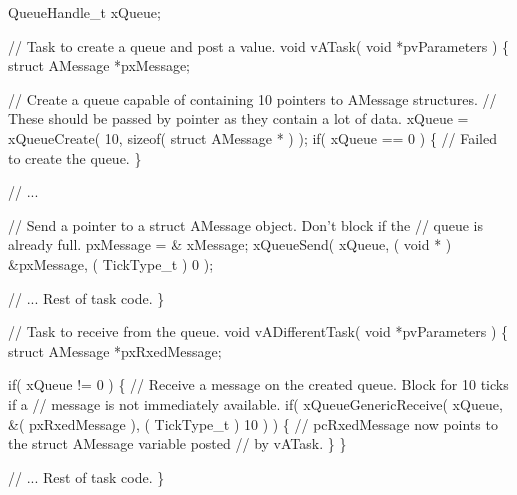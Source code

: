 \begin{DoxyPre}QueueHandle\_t xQueue;\end{DoxyPre}



\begin{DoxyPre}// Task to create a queue and post a value.
void vATask( void *pvParameters )
\{
struct AMessage *pxMessage;\end{DoxyPre}



\begin{DoxyPre}   // Create a queue capable of containing 10 pointers to AMessage structures.
   // These should be passed by pointer as they contain a lot of data.
   xQueue = xQueueCreate( 10, sizeof( struct AMessage * ) );
   if( xQueue == 0 )
   \{
    // Failed to create the queue.
   \}\end{DoxyPre}



\begin{DoxyPre}   // ...\end{DoxyPre}



\begin{DoxyPre}   // Send a pointer to a struct AMessage object.  Don't block if the
   // queue is already full.
   pxMessage = \& xMessage;
   xQueueSend( xQueue, ( void * ) \&pxMessage, ( TickType\_t ) 0 );\end{DoxyPre}



\begin{DoxyPre}   // ... Rest of task code.
\}\end{DoxyPre}



\begin{DoxyPre}// Task to receive from the queue.
void vADifferentTask( void *pvParameters )
\{
struct AMessage *pxRxedMessage;\end{DoxyPre}



\begin{DoxyPre}   if( xQueue != 0 )
   \{
    // Receive a message on the created queue.  Block for 10 ticks if a
    // message is not immediately available.
    if( xQueueGenericReceive( xQueue, \&( pxRxedMessage ), ( TickType\_t ) 10 ) )
    \{
        // pcRxedMessage now points to the struct AMessage variable posted
        // by vATask.
    \}
   \}\end{DoxyPre}



\begin{DoxyPre}   // ... Rest of task code.
\}
\end{DoxyPre}
 